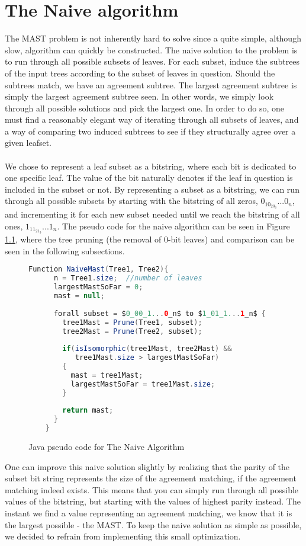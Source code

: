 \chapter{The Naive algorithm}
The MAST problem is not inherently hard to solve since a quite simple, although slow, algorithm can quickly be constructed. The naive solution to the problem is to run through all possible subsets of leaves. For each subset, induce the subtrees of the input trees according to the subset of leaves in question. Should the subtrees match, we have an agreement subtree. The largest agreement subtree is simply the largest agreement subtree seen. In other words, we simply look through all possible solutions and pick the largest one. In order to do so, one must find a reasonably elegant way of iterating through all subsets of leaves, and a way of comparing two induced subtrees to see if they structurally agree over a given leafset. 
\\
\\
We chose to represent a leaf subset as a bitstring, where each bit is dedicated to one specific leaf. The value of the bit naturally denotes if the leaf in question is included in the subset or not. By representing a subset as a bitstring, we can run through all possible subsets by starting with the bitstring of all zeros, $0_10_20_3...0_n$, and incrementing it for each new subset needed until we reach the bitstring of all ones, $1_11_21_3...1_n$. The pseudo code for the naive algorithm can be seen in Figure \ref{Code:Naive1}, where the tree pruning (the removal of 0-bit leaves) and comparison can be seen in the following subsections.

\begin{figure}
	\begin{lstlisting}[language=Java, mathescape]
	Function NaiveMast(Tree1, Tree2){
	  n = Tree1.size;  //number of leaves
	  largestMastSoFar = 0;
	  mast = null;
	  
	  forall subset = $0_00_1...0_n$ to $1_01_1...1_n$ {
	    tree1Mast = Prune(Tree1, subset);
	    tree2Mast = Prune(Tree2, subset);
	    
	    if(isIsomorphic(tree1Mast, tree2Mast) && 
	       tree1Mast.size > largestMastSoFar) 
	    {
	      mast = tree1Mast;
	      largestMastSoFar = tree1Mast.size;
	    }
	    
	    return mast;
	  }
	}
	\end{lstlisting}
	\caption{Java pseudo code for The Naive Algorithm}
	\label{Code:Naive1}
\end{figure}
One can improve this naive solution slightly by realizing that the parity of the subset bit string represents the size of the agreement matching, if the agreement matching indeed exists. This means that you can simply run through all possible values of the bitstring, but starting with the values of highest parity instead. The instant we find a value representing an agreement matching, we know that it is the largest possible - the MAST. To keep the naive solution as simple as possible, we decided to refrain from implementing this small optimization.

